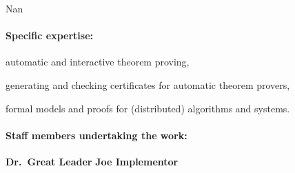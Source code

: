 \begin{sitedescription}{Nan}
\paragraph{Specific expertise:}

\begin{compactitem}
\item automatic and interactive theorem proving,
\item generating and checking certificates for automatic theorem provers,
\item formal models and proofs for (distributed) algorithms and systems.
\end{compactitem}

\paragraph{Staff members undertaking the work:}

\textbf{Dr.\ Great Leader}
\textbf{Joe Implementor}
\end{sitedescription}

